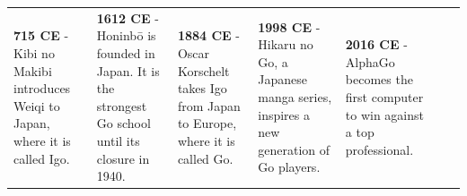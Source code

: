 \documentclass[14pt, a1paper, portrait, margin=0mm, innermargin=15mm, blockverticalspace=15mm, colspace=15mm, subcolspace=8mm]{tikzposter}
\begin{document}
\begin{columns}
{\begin{center}
\begin{tabular}{p{} p{} p{} p{} p{} p{} p{}}
            \textbf{715 CE} - Kibi no Makibi introduces Weiqi to Japan, where it is called Igo. &
            \textbf{1612 CE} - Honinbō is founded in Japan. It is the strongest Go school until its closure in 1940. &
            \textbf{1884 CE} - Oscar Korschelt takes Igo from Japan to Europe, where it is called Go. &
            \textbf{1998 CE} - Hikaru no Go, a Japanese manga series, inspires a new generation of Go players. &
            \textbf{2016 CE} - AlphaGo becomes the first computer to win against a top professional.\\
        \end{tabular}
        \end{center}
        
    }
    \end{columns}
    

    
\end{document}
